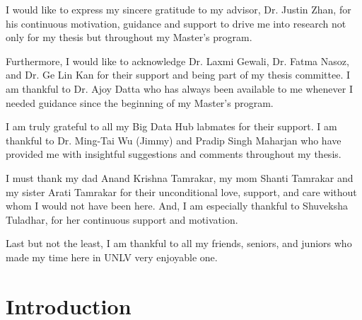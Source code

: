 \documentclass[11pt,openright]{report}
\begin{document}
\begin{thesisacknowledgments}
I would like to express my sincere gratitude to my advisor, Dr. Justin Zhan, for his continuous motivation, guidance and support to drive me into research not only for my thesis but throughout my Master's program.

Furthermore, I would like to acknowledge Dr. Laxmi Gewali, Dr. Fatma Nasoz, and Dr. Ge Lin Kan for their support and being part of my thesis committee. I am thankful to Dr. Ajoy Datta who has always been available to me whenever I needed guidance since the beginning of my Master's program.

I am truly grateful to all my Big Data Hub labmates for their support. I am thankful to Dr. Ming-Tai Wu (Jimmy) and Pradip Singh Maharjan who have provided me with insightful suggestions and comments throughout my thesis.

I must thank my dad Anand Krishna Tamrakar, my mom Shanti Tamrakar and my sister Arati Tamrakar for their unconditional love, support, and care without whom I would not have been here. And, I am especially thankful to Shuveksha Tuladhar, for her continuous support and motivation.

Last but not the least, I am thankful to all my friends, seniors, and juniors who made my time here in UNLV very enjoyable one.
\end{thesisacknowledgments}

\pagestyle{plain}

\tableofcontents
\clearpage
\listoftables
\clearpage
\listoffigures
\clearpage
\listofalgorithmes
\clearpage

\chapter{Introduction}\label{chapter:introduction} 
\end{document}
